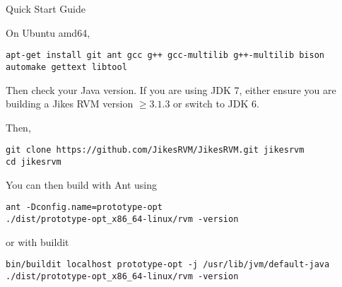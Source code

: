 \begin{chapter}{Quick Start Guide}
\label{cha:quickstartguide}

On Ubuntu amd64,

\begin{lstlisting}
apt-get install git ant gcc g++ gcc-multilib g++-multilib bison automake gettext libtool
\end{lstlisting}


Then check your Java version.  If you are using JDK 7, either ensure you are building a Jikes RVM version $\geq 3.1.3$ or switch to JDK 6.

Then, 
\begin{lstlisting}
git clone https://github.com/JikesRVM/JikesRVM.git jikesrvm
cd jikesrvm
\end{lstlisting}


You can then build with Ant using
\begin{lstlisting}
ant -Dconfig.name=prototype-opt
./dist/prototype-opt_x86_64-linux/rvm -version
\end{lstlisting}

or with buildit

\begin{lstlisting}
bin/buildit localhost prototype-opt -j /usr/lib/jvm/default-java
./dist/prototype-opt_x86_64-linux/rvm -version
\end{lstlisting}

\end{chapter}
